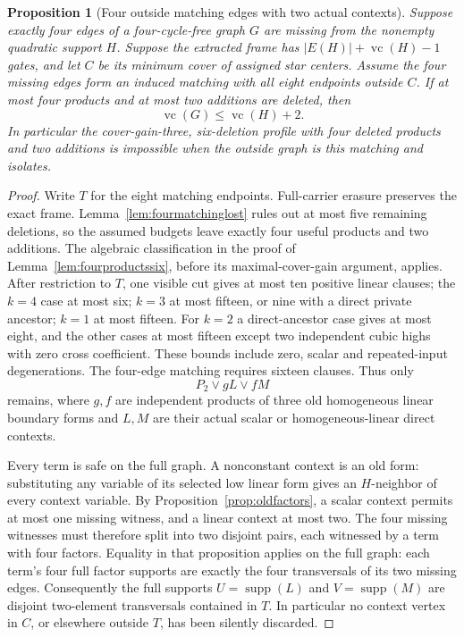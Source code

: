 \documentclass[11pt]{article}
\newcommand{\supp}{\operatorname{supp}}
\newcommand{\vc}{\operatorname{vc}}
\newtheorem{proposition}[theorem]{Proposition}
\theoremstyle{definition}
\theoremstyle{remark}
\begin{document}
\begin{proposition}[Four outside matching edges with two actual contexts]\label{prop:fouroutsidegain}
Suppose exactly four edges of a four-cycle-free graph $G$ are missing from the nonempty quadratic support $H$. Suppose the extracted frame has $|E(H)|+\vc(H)-1$ gates, and let $C$ be its minimum cover of assigned star centers. Assume the four missing edges form an induced matching with all eight endpoints outside $C$. If at most four products and at most two additions are deleted, then
\[
 \vc(G)\le\vc(H)+2.
\]
In particular the cover-gain-three, six-deletion profile with four deleted products and two additions is impossible when the outside graph is this matching and isolates.
\end{proposition}
\begin{proof}
Write $T$ for the eight matching endpoints. Full-carrier erasure preserves the exact frame. Lemma~\ref{lem:fourmatchinglost} rules out at most five remaining deletions, so the assumed budgets leave exactly four useful products and two additions. The algebraic classification in the proof of Lemma~\ref{lem:fourproductssix}, before its maximal-cover-gain argument, applies. After restriction to $T$, one visible cut gives at most ten positive linear clauses; the $k=4$ case at most six; $k=3$ at most fifteen, or nine with a direct private ancestor; $k=1$ at most fifteen. For $k=2$ a direct-ancestor case gives at most eight, and the other cases at most fifteen except two independent cubic highs with zero cross coefficient. These bounds include zero, scalar and repeated-input degenerations. The four-edge matching requires sixteen clauses. Thus only
\[
 P_2\vee gL\vee fM
\]
remains, where $g,f$ are independent products of three old homogeneous linear boundary forms and $L,M$ are their actual scalar or homogeneous-linear direct contexts.

Every term is safe on the full graph. A nonconstant context is an old form: substituting any variable of its selected low linear form gives an $H$-neighbor of every context variable. By Proposition~\ref{prop:oldfactors}, a scalar context permits at most one missing witness, and a linear context at most two. The four missing witnesses must therefore split into two disjoint pairs, each witnessed by a term with four factors. Equality in that proposition applies on the full graph: each term's four full factor supports are exactly the four transversals of its two missing edges. Consequently the full supports $U=\supp(L)$ and $V=\supp(M)$ are disjoint two-element transversals contained in $T$. In particular no context vertex in $C$, or elsewhere outside $T$, has been silently discarded.


\end{proof}
\end{document}
